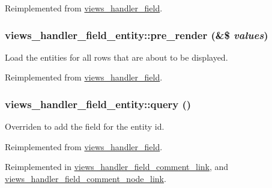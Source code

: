 Reimplemented from \hyperlink{classviews__handler__field_a3a290c7df3ead81e5cd244ad5335b1cc}{views\_\-handler\_\-field}.\hypertarget{classviews__handler__field__entity_af42db39095ee851eb7cc34c8ea2e6beb}{
\subsubsection[{pre\_\-render}]{\setlength{\rightskip}{0pt plus 5cm}views\_\-handler\_\-field\_\-entity::pre\_\-render (\&\$ {\em values})}}
\label{classviews__handler__field__entity_af42db39095ee851eb7cc34c8ea2e6beb}
Load the entities for all rows that are about to be displayed. 

Reimplemented from \hyperlink{classviews__handler__field_aff134f525e1f83271183939fda4cd0e8}{views\_\-handler\_\-field}.\hypertarget{classviews__handler__field__entity_a71638207b6bd704ef4222b61f150c4af}{
\subsubsection[{query}]{\setlength{\rightskip}{0pt plus 5cm}views\_\-handler\_\-field\_\-entity::query ()}}
\label{classviews__handler__field__entity_a71638207b6bd704ef4222b61f150c4af}
Overriden to add the field for the entity id. 

Reimplemented from \hyperlink{classviews__handler__field_a4f661f91bcbe80d4a00c30a31456c502}{views\_\-handler\_\-field}.

Reimplemented in \hyperlink{classviews__handler__field__comment__link_ac19c2cedce77bfa9490624df9cd1eac2}{views\_\-handler\_\-field\_\-comment\_\-link}, and \hyperlink{classviews__handler__field__comment__node__link_af48614fab00f4f6b8ec7e68a3d352b20}{views\_\-handler\_\-field\_\-comment\_\-node\_\-link}.

